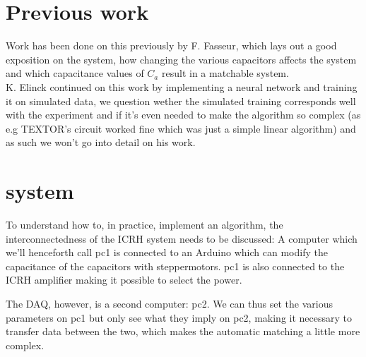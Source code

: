 \section{Previous work}
Work has been done on this previously by F. Fasseur\cite{Saussez}, which lays
out a good exposition on the system, how changing the various capacitors affects the system 
and which capacitance values of $C_a$ result in a matchable system.\\

K. Elinck continued on this work by implementing a neural network and training it on simulated data\cite{Gen2019},
we question wether the simulated training corresponds well with the experiment and if it's even needed to make the algorithm
so complex (as e.g TEXTOR's circuit worked fine\cite{DURODIE1993477} which was just a simple linear algorithm) and as such 
we won't go into detail on his work.
\section{system}
To understand how to, in practice, implement an algorithm, the interconnectedness of the ICRH system needs to be discussed:
A computer which we'll henceforth call pc1 is connected to an Arduino which can modify the capacitance of the capacitors
with steppermotors. pc1 is also connected to the ICRH amplifier
making it possible to select the power.

The DAQ, however, is a second computer: pc2. We can thus set the various
parameters on pc1 but only see what they imply on pc2, making it necessary to
transfer data between the two, which makes the automatic matching a little more
complex.
